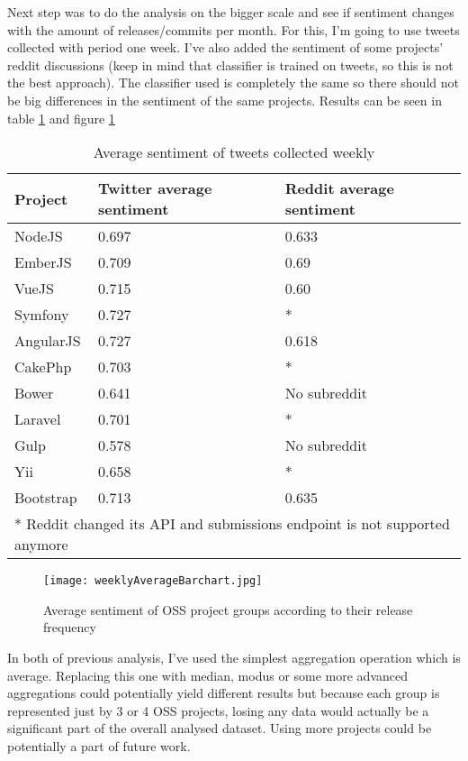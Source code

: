 
Next step was to do the analysis on the bigger scale and see if sentiment changes with the amount of releases/commits per month. For this, I'm going to use tweets collected with period one week. I've also added the sentiment of some projects' reddit discussions (keep in mind that classifier is trained on tweets, so this is not the best approach). The classifier used is completely the same so there should not be big differences in the sentiment of the same projects. Results can be seen in table \ref{table:weeklyAverageTable} and figure \ref{fig:weeklyAverageBarchart}

\begin{table}[H]
\centering
\begin{tabular}{ |p{2cm}|p{5.5cm}|p{5.5cm}|}
 \hline
\textbf{Project }& \textbf{Twitter average sentiment} & \textbf{Reddit average sentiment}\\
 \hline
 NodeJS   & 0.697   & 0.633 \\ \hline
 EmberJS   & 0.709   & 0.69\\ \hline
 VueJS   & 0.715   & 0.60\\ \hline 
 Symfony & 0.727   & *\\ \hline   
 AngularJS   & 0.727   & 0.618\\ \hline
 CakePhp & 0.703  & * \\ \hline 
 Bower   & 0.641   & No subreddit\\ \hline 
 Laravel & 0.701   & *\\ \hline
 Gulp & 0.578   & No subreddit\\ \hline
 Yii & 0.658  & * \\ \hline
 Bootstrap & 0.713  & 0.635\\ \hline
 \multicolumn{3}{l}{* Reddit changed its API and submissions endpoint is not supported anymore}
\end{tabular}
\caption{Average sentiment of tweets collected weekly}
\label{table:weeklyAverageTable}
\end{table}


\begin{figure}[H]%
    \centering
	\texttt{[image: weeklyAverageBarchart.jpg]}
    \caption{Average sentiment of OSS project groups according to their release frequency}%
    \label{fig:weeklyAverageBarchart}%
\end{figure}

In both of previous analysis, I've used the simplest aggregation operation which is average. Replacing this one with median, modus or some more advanced aggregations could potentially yield different results but because each group is represented just by 3 or 4 OSS projects, losing any data would actually be a significant part of the overall analysed dataset. Using more projects could be potentially a part of future work.